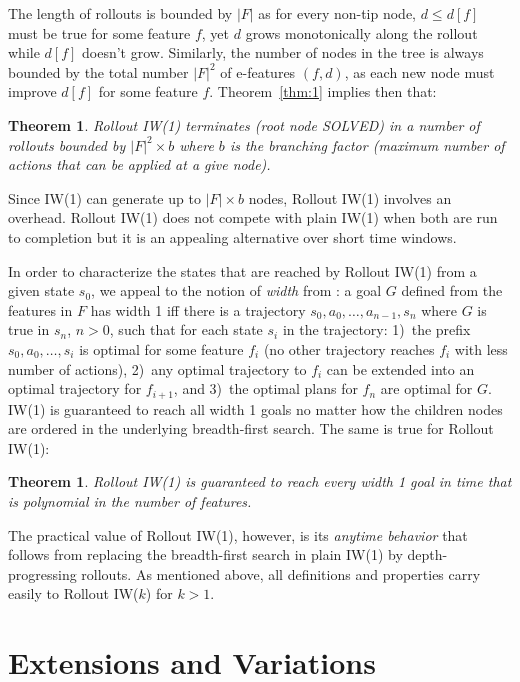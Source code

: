 \documentclass[letterpaper]{article}
\newtheorem{theorem}[definition]{Theorem}
\begin{document}
The length of rollouts is bounded by $|F|$ as for every non-tip node,
$d \leq d[f]$ must be true for some feature $f$, yet $d$ grows monotonically
along the rollout while $d[f]$ doesn't  grow. Similarly, the number of nodes in the tree is always  bounded by the total number
$|F|^2$ of e-features $(f,d)$,  as each new node must improve $d[f]$ for some feature $f$.
Theorem~\ref{thm:1} implies then that:%

\begin{theorem}
Rollout IW(1) terminates (root node SOLVED) in a number of rollouts bounded by
$|F|^2 \times b$ where $b$ is the branching factor (maximum number of
actions that can be applied at a give node).
\end{theorem}

Since IW(1) can generate up to $|F| \times b$ nodes, Rollout IW(1) involves an  overhead.
Rollout IW(1) does not compete with plain IW(1) when both are run to completion but
it is an appealing alternative over short time windows.

In order to characterize the states that are reached by Rollout IW(1) from a given state $s_0$,
we appeal to the notion of \emph{width} from \cite{nir:ecai2012}:
a goal $G$ defined from the features in $F$ has width 1 iff
there is a trajectory $s_0,a_0,\ldots,a_{n-1},s_n$ where $G$ is true in $s_n$,   $n > 0$,
such that for each state $s_i$ in the trajectory:
1)~the prefix $s_0,a_0,\ldots,s_i$ is optimal   for some feature $f_i$ (no other trajectory reaches $f_i$ with less number of actions),
2)~any  optimal trajectory to $f_i$ can be extended into an optimal trajectory for  $f_{i+1}$,
and 3)~the optimal plans for $f_n$ are optimal for $G$. IW(1) is guaranteed to reach all width 1 goals no matter how the children nodes are ordered
in the underlying breadth-first search. The same is true for Rollout IW(1):

\begin{theorem}
Rollout IW(1) is guaranteed to reach every width 1 goal in time that is polynomial in the number of features.
\end{theorem}

The practical value of Rollout IW(1), however,  is its \emph{anytime behavior} that
follows from replacing the breadth-first search in plain IW(1) by depth-progressing
rollouts. As mentioned above, all definitions and properties carry easily
to Rollout IW($k$) for $k > 1$.


\section{Extensions and Variations}
\end{document}
